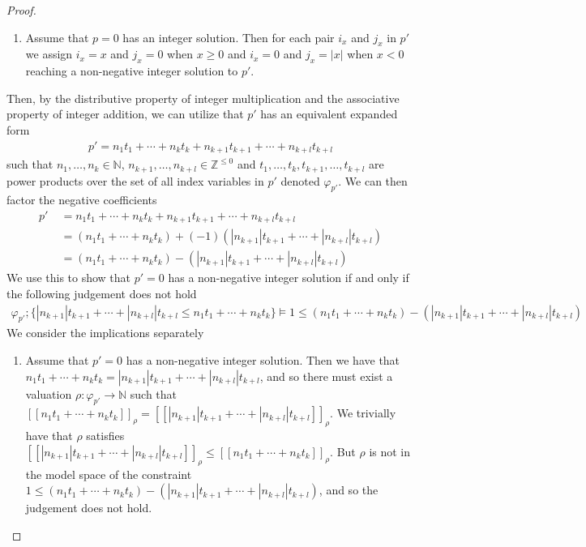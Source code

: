 \begin{lemma}
\begin{proof}
\begin{enumerate}
    \item Assume that $p=0$ has an integer solution. Then for each pair $i_x$ and $j_x$ in $p'$ we assign $i_x = x$ and $j_x = 0$ when $x \geq 0$ and $i_x = 0$ and $j_x = |x|$ when $x < 0$ reaching a non-negative integer solution to $p'$.
\end{enumerate}
%
Then, by the distributive property of integer multiplication and the associative property of integer addition, we can utilize that $p'$ has an equivalent expanded form 
\begin{align*}
p' = n_1 t_1 + \cdots + n_k t_k + n_{k+1} t_{k+1} + \cdots + n_{k+l} t_{k+l}    
\end{align*}
such that $n_1,\dots,n_k\in\mathbb{N}$, $n_{k+1},\dots,n_{k+l} \in \mathbb{Z}^{\leq 0}$ and $t_1,\dots,t_k,t_{k+1},\dots,t_{k+l}$ are power products over the set of all index variables in $p'$ denoted $\varphi_{p'}$. We can then factor the negative coefficients
\begin{align*}
    p' \;&= n_1 t_1 + \cdots + n_k t_k + n_{k+1} t_{k+1} + \cdots + n_{k+l} t_{k+l}\\ 
    \;&= (n_1 t_1 + \cdots + n_k t_k) + (-1)(|n_{k+1}| t_{k+1} + \cdots + |n_{k+l}| t_{k+l})\\
    \;&= (n_1 t_1 + \cdots + n_k t_k) - (|n_{k+1}| t_{k+1} + \cdots + |n_{k+l}| t_{k+l})
\end{align*}
We use this to show that $p'=0$ has a non-negative integer solution if and only if the following judgement does not hold 
{\small
\begin{align*}
    \varphi_{p'};\{|n_{k+1}| t_{k+1} + \cdots + |n_{k+l}| t_{k+l} \leq n_1 t_1 + \cdots + n_k t_k\}\vDash 1 \leq (n_1 t_1 + \cdots + n_k t_k) - (|n_{k+1}| t_{k+1} + \cdots + |n_{k+l}| t_{k+l}) 
\end{align*}}
We consider the implications separately
\begin{enumerate}
    \item Assume that $p'=0$ has a non-negative integer solution. Then we have that $n_1 t_1 + \cdots + n_k t_k = |n_{k+1}| t_{k+1} + \cdots + |n_{k+l}| t_{k+l}$, and so there must exist a valuation $\rho : \varphi_{p'} \longrightarrow \mathbb{N}$ such that $[\![n_1 t_1 + \cdots + n_k t_k]\!]_\rho = [\![|n_{k+1}| t_{k+1} + \cdots + |n_{k+l}| t_{k+l}]\!]_\rho$. We trivially have that $\rho$ satisfies $[\![|n_{k+1}| t_{k+1} + \cdots + |n_{k+l}| t_{k+l}]\!]_\rho \leq [\![n_1 t_1 + \cdots + n_k t_k]\!]_\rho$. But $\rho$ is not in the model space of the constraint $1 \leq (n_1 t_1 + \cdots + n_k t_k) - (|n_{k+1}| t_{k+1} + \cdots + |n_{k+l}| t_{k+l})$, and so the judgement does not hold.
    

\end{enumerate}
\end{proof}
\end{lemma}
